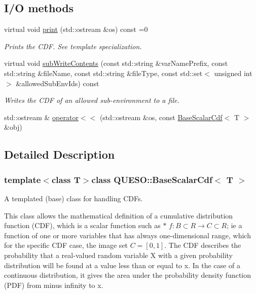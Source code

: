 \subsection*{I/\-O methods}
\begin{DoxyCompactItemize}
\item 
virtual void \hyperlink{class_q_u_e_s_o_1_1_base_scalar_cdf_a131a7c148188f3f70c2db44cc1a93bc8}{print} (std\-::ostream \&os) const =0
\begin{DoxyCompactList}\small\item\em Prints the C\-D\-F. See template specialization. \end{DoxyCompactList}\item 
virtual void \hyperlink{class_q_u_e_s_o_1_1_base_scalar_cdf_abdd6c6f5f8f028a6ffd30168885b6338}{sub\-Write\-Contents} (const std\-::string \&var\-Name\-Prefix, const std\-::string \&file\-Name, const std\-::string \&file\-Type, const std\-::set$<$ unsigned int $>$ \&allowed\-Sub\-Env\-Ids) const 
\begin{DoxyCompactList}\small\item\em Writes the C\-D\-F of an allowed sub-\/environment to a file. \end{DoxyCompactList}\item 
std\-::ostream \& \hyperlink{class_q_u_e_s_o_1_1_base_scalar_cdf_a474950d32c26caa1e88dbee2788cc1bf}{operator$<$$<$} (std\-::ostream \&os, const \hyperlink{class_q_u_e_s_o_1_1_base_scalar_cdf}{Base\-Scalar\-Cdf}$<$ T $>$ \&obj)
\end{DoxyCompactItemize}


\subsection{Detailed Description}
\subsubsection*{template$<$class T$>$class Q\-U\-E\-S\-O\-::\-Base\-Scalar\-Cdf$<$ T $>$}

A templated (base) class for handling C\-D\-Fs. 

This class allows the mathematical definition of a cumulative distribution function (C\-D\-F), which is a scalar function such as $\ast$ $ f: B \subset R \rightarrow C \subset R $; ie a function of one or more variables that has always one-\/dimensional range, which for the specific C\-D\-F case, the image set $ C = [0,1]$. The C\-D\-F describes the probability that a real-\/valued random variable X with a given probability distribution will be found at a value less than or equal to x. In the case of a continuous distribution, it gives the area under the probability density function (P\-D\-F) from minus infinity to x. 

